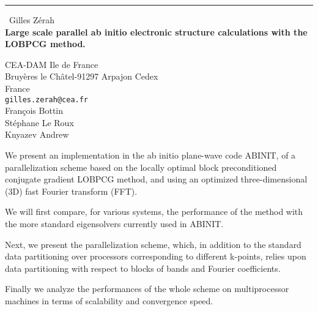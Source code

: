 \documentclass{report}
\begin{document}
\begin{center}
\rule{6in}{1pt} \
{\large Gilles Z\'{e}rah \\
{\bf Large scale parallel ab initio electronic structure calculations with the LOBPCG method.}}

CEA-DAM Ile de France \\ Bruy\`{e}res le Ch\^{a}tel-91297 Arpajon Cedex \\ France
\\
{\tt gilles.zerah@cea.fr}\\
Fran\c{c}ois Bottin\\
St\'{e}phane Le Roux\\
	Knyazev Andrew\end{center}

We present an implementation in the ab initio plane-wave code ABINIT, of
a parallelization scheme based on the locally optimal block
preconditioned conjugate gradient LOBPCG method, and using an optimized
three-dimensional (3D) fast Fourier transform (FFT).

We will first compare, for various systems, the performance of the method
with the more standard eigensolvers currently used in ABINIT.

Next, we present the parallelization scheme, which, in addition to the
standard data partitioning over processors corresponding to different
k-points, relies upon data partitioning with respect to blocks of bands
and Fourier coefficients.

Finally we analyze the performances of the whole scheme on multiprocessor
machines in terms of scalability and convergence speed.
\end{document}
